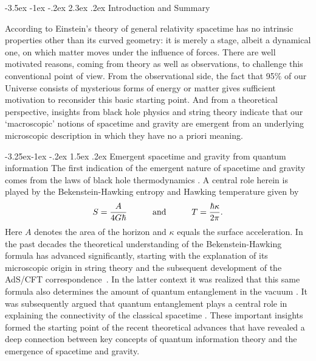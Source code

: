\documentclass[a4paper,12pt]{article}
\makeatletter
\renewcommand\section{\@startsection {section}{1}{\z@}%
                                   {-3.5ex \@plus -1ex \@minus -.2ex}%
                                   {2.3ex \@plus.2ex}%
                                   {\normalfont\large\bfseries}}
\renewcommand\subsection{\@startsection{subsection}{2}{\z@}%
                                     {-3.25ex\@plus -1ex \@minus -.2ex}%
                                     {1.5ex \@plus .2ex}%
                                     {\normalfont\bfseries}}
\newcommand{\be}{\begin{equation}}
\newcommand{\ee}{\end{equation}}
\makeatother
\begin{document}
\date{\today}

\section{Introduction and Summary}

According to Einstein's theory of general relativity  spacetime has  no intrinsic properties other than its curved geometry: it is merely a stage, albeit a dynamical one, on which matter moves under the influence of forces. There are well motivated reasons, coming from theory as well as observations, to challenge this conventional point of view. From the observational side, the fact that 95$\%$ of our Universe consists of mysterious forms of energy or matter gives sufficient motivation to reconsider this basic starting point. And from a theoretical perspective, insights from black hole physics and string theory indicate that our `macroscopic' notions of spacetime and gravity are emergent from an underlying microscopic description in which they have no a priori meaning. 

\subsection{Emergent spacetime and gravity from quantum information}
The first indication of the emergent nature of spacetime and gravity comes from the laws of black hole thermodynamics \cite{Bardeen}. A central role herein is played by the Bekenstein-Hawking entropy \cite{Bekenstein,Hawking} and Hawking temperature  \cite{Davies,Unruh} given by
\be
\label{BH-ent}
S 
= {A
\over 4G\hbar} 
\qquad\quad\mbox{and}\qquad\quad
T= {\hbar \kappa\over 2\pi}.
\ee
Here $A$ denotes the area of the horizon and  $\kappa$ equals the surface acceleration.  
In the past decades the theoretical understanding of the Bekenstein-Hawking formula 
has advanced significantly, starting with the explanation of its 
microscopic origin in string theory \cite{StromVafa} and the subsequent 
development of the AdS/CFT correspondence~\cite{AdS-CFT}.  In the latter context it was realized that this same formula also determines the amount of quantum entanglement in the vacuum 
\cite{RyuTakayanagi}. It was subsequently argued that   quantum entanglement plays a central 
role in explaining the connectivity of the classical spacetime \cite{vanRaamsdonk}. These 
important insights formed the starting point of the recent theoretical advances that have revealed 
a deep connection between key concepts of quantum information theory and the 
emergence of spacetime and gravity. 
\end{document}
